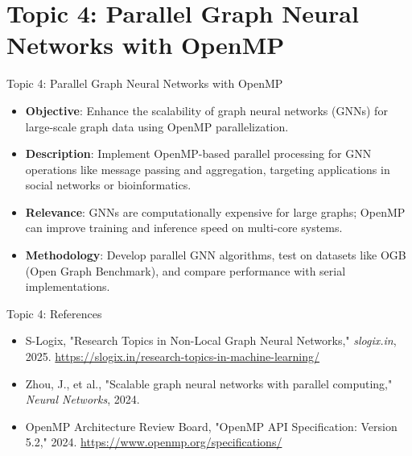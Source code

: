 \documentclass{beamer}
\begin{document}
\section{Topic 4: Parallel Graph Neural Networks with OpenMP}
\begin{frame}{Topic 4: Parallel Graph Neural Networks with OpenMP}
\begin{itemize}
    \item \textbf{Objective}: Enhance the scalability of graph neural networks (GNNs) for large-scale graph data using OpenMP parallelization.
    \item \textbf{Description}: Implement OpenMP-based parallel processing for GNN operations like message passing and aggregation, targeting applications in social networks or bioinformatics.
    \item \textbf{Relevance}: GNNs are computationally expensive for large graphs; OpenMP can improve training and inference speed on multi-core systems.
    \item \textbf{Methodology}: Develop parallel GNN algorithms, test on datasets like OGB (Open Graph Benchmark), and compare performance with serial implementations.
\end{itemize}
\end{frame}

\begin{frame}{Topic 4: References}
\begin{itemize}
    \item 
          S-Logix, "Research Topics in Non-Local Graph Neural Networks," \textit{slogix.in}, 2025. \url{https://slogix.in/research-topics-in-machine-learning/}
    \item  
          Zhou, J., et al., "Scalable graph neural networks with parallel computing," \textit{Neural Networks}, 2024.
    \item 
          OpenMP Architecture Review Board, "OpenMP API Specification: Version 5.2," 2024. \url{https://www.openmp.org/specifications/}
\end{itemize}
\end{frame}
\end{document}
